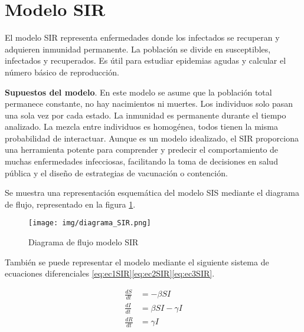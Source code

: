\section{Modelo SIR}
El modelo SIR representa enfermedades donde los infectados se recuperan y adquieren inmunidad permanente. La población se divide en susceptibles, infectados y recuperados. Es útil para estudiar epidemias agudas y calcular el número básico de reproducción.

\textbf{Supuestos del modelo}. En este modelo se asume que la población total permanece constante, no hay nacimientos ni muertes. Los individuos solo pasan una sola vez por cada estado. La inmunidad es permanente durante el tiempo analizado. La mezcla entre individuos es homogénea, todos tienen la misma probabilidad de interactuar.
Aunque es un modelo idealizado, el SIR proporciona una herramienta potente para comprender y predecir el comportamiento de muchas enfermedades infecciosas, facilitando la toma de decisiones en salud pública y el diseño de estrategias de vacunación o contención.

Se muestra una representación esquemática del modelo SIS mediante el diagrama de flujo, representado en la figura \ref{fig:diagrama SIR}.
\begin{figure}[H]
    \centering
    \texttt{[image: img/diagrama\_SIR.png]}
    \caption{Diagrama de flujo modelo SIR}
    \label{fig:diagrama SIR}
    \vspace{0.5cm} %
\end{figure}

También se puede representar el modelo mediante el siguiente sistema de ecuaciones diferenciales \eqref{eq:ec1SIR}\eqref{eq:ec2SIR}\eqref{eq:ec3SIR}.

\begin{align}
\frac{dS}{dt} &= -\beta SI \label{eq:ec1SIR} \\
\frac{dI}{dt} &= \beta SI - \gamma I \label{eq:ec2SIR} \\
\frac{dR}{dt} &= \gamma I \label{eq:ec3SIR}
\end{align}

